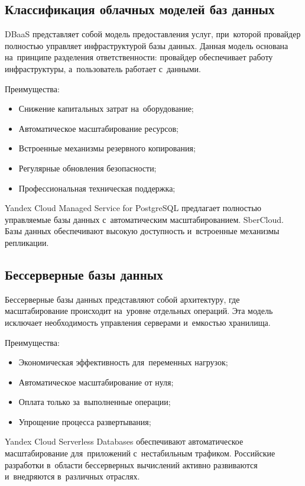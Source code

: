 \documentclass{ou}
\begin{document}
\subsection{Классификация облачных моделей баз данных}
DBaaS представляет собой модель предоставления услуг, при~которой провайдер полностью управляет инфраструктурой базы данных. Данная модель основана на~принципе разделения ответственности: провайдер обеспечивает работу инфраструктуры, а~пользователь работает с~данными.

Преимущества:
\begin{itemize}[label=-, leftmargin=0em, itemindent=3.35em, nosep]
\item Снижение капитальных затрат на~оборудование;
\item Автоматическое масштабирование ресурсов;
\item Встроенные механизмы резервного копирования;
\item Регулярные обновления безопасности;
\item Профессиональная техническая поддержка;
\end{itemize}

Yandex Cloud Managed Service for PostgreSQL предлагает полностью управляемые базы данных с~автоматическим масштабированием. SberCloud. Базы данных обеспечивают высокую доступность и~встроенные механизмы репликации.
\subsection{Бессерверные базы данных}
Бессерверные базы данных представляют собой архитектуру, где масштабирование происходит на~уровне отдельных операций. Эта модель исключает необходимость управления серверами и~емкостью хранилища.

Преимущества:
\begin{itemize}[label=-, leftmargin=0em, itemindent=3.35em, nosep]
\item Экономическая эффективность для~переменных нагрузок;
\item Автоматическое масштабирование от нуля;
\item Оплата только за~выполненные операции;
\item Упрощение процесса развертывания;
\end{itemize}

Yandex Cloud Serverless Databases обеспечивают автоматическое масштабирование для~приложений с~нестабильным трафиком. Российские разработки в~области бессерверных вычислений активно развиваются и~внедряются в~различных отраслях.
\end{document}
